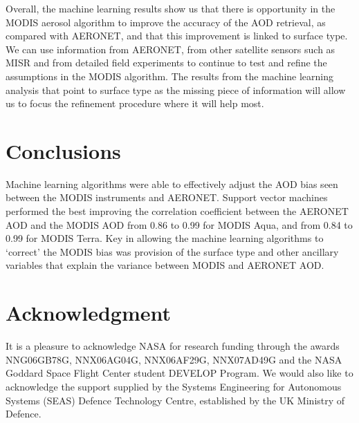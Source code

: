 \documentclass[journal]{IEEEtran}
\begin{document}
Overall, the machine learning results show us that there is opportunity in the MODIS aerosol algorithm to improve the accuracy of the AOD retrieval, as compared with AERONET, and that this improvement is linked to surface type.  We can use information from AERONET, from other satellite sensors such as MISR and from detailed field experiments to continue to test and refine the assumptions in the MODIS algorithm.  The results from the machine learning analysis that point to surface type as the missing piece of information will allow us to focus the refinement procedure where it will help most.

\section{Conclusions \label{Section.Conclusions}}

Machine learning algorithms were able to effectively adjust the AOD bias seen between the MODIS instruments and AERONET. Support vector machines performed the best improving the correlation coefficient between the AERONET AOD and the MODIS AOD from 0.86 to 0.99 for MODIS Aqua, and from 0.84 to 0.99 for MODIS Terra. Key in allowing the machine learning algorithms to \lq correct' the MODIS bias was provision of the surface type and other ancillary variables that explain the variance between MODIS and AERONET AOD.

\appendices
\section*{Acknowledgment}

It is a pleasure to acknowledge NASA for research funding through the awards NNG06GB78G, NNX06AG04G, NNX06AF29G, NNX07AD49G and the NASA Goddard Space Flight Center student DEVELOP Program. We would also like to acknowledge the support supplied by the Systems Engineering for Autonomous Systems (SEAS) Defence Technology Centre, established by the UK Ministry of Defence.



\end{document}
